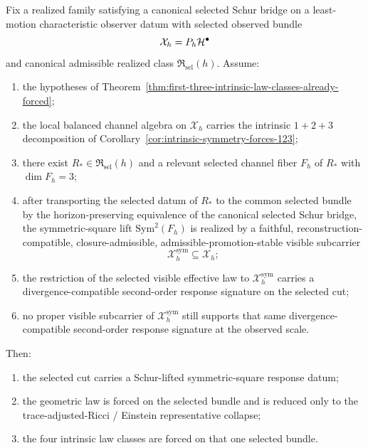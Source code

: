 \begin{theorem}
\label{thm:three-channel-schur-tensor-lift-forces-geometric-lane}
Fix a realized family satisfying a canonical selected Schur bridge on a
least-motion characteristic observer datum with selected observed bundle
\[
\mathcal X_h=P_h\mathcal{H}^\bullet
\]
and canonical admissible realized class \(\mathfrak R_{\mathrm{sel}}(h)\).
Assume:
\begin{enumerate}[label=(\roman*), leftmargin=2em, itemsep=0.2em]
\item the hypotheses of
      Theorem~\ref{thm:first-three-intrinsic-law-classes-already-forced};
\item the local balanced channel algebra on \(\mathcal X_h\) carries the
      intrinsic \(1+2+3\) decomposition of
      Corollary~\ref{cor:intrinsic-symmetry-forces-123};
\item there exist \(R_\ast\in\mathfrak R_{\mathrm{sel}}(h)\) and a relevant
      selected channel fiber \(F_h\) of \(R_\ast\) with \(\dim F_h=3\);
\item after transporting the selected datum of \(R_\ast\) to the common
      selected bundle by the horizon-preserving equivalence of the canonical
      selected Schur bridge, the symmetric-square lift \(\mathrm{Sym}^2(F_h)\)
      is realized by a faithful, reconstruction-compatible,
      closure-admissible, admissible-promotion-stable visible subcarrier
      \[
      \mathcal X_h^{\mathrm{sym}}\subseteq\mathcal X_h;
      \]
\item the restriction of the selected visible effective law to
      \(\mathcal X_h^{\mathrm{sym}}\) carries a
      divergence-compatible second-order response signature on the selected
      cut;
\item no proper visible subcarrier of \(\mathcal X_h^{\mathrm{sym}}\) still
      supports that same divergence-compatible second-order response signature
      at the observed scale.
\end{enumerate}
Then:
\begin{enumerate}[label=(\alph*), leftmargin=2em, itemsep=0.2em]
\item the selected cut carries a Schur-lifted symmetric-square response
      datum;
\item the geometric law is forced on the selected bundle and is reduced only
      to the trace-adjusted-Ricci / Einstein representative collapse;
\item the four intrinsic law classes are forced on that one selected
      bundle.
\end{enumerate}
\end{theorem}

